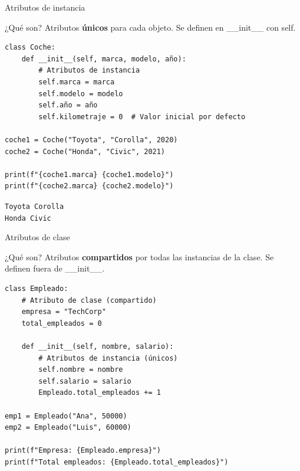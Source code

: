 \documentclass{beamer}
\begin{document}
\begin{frame}[fragile]{Atributos de instancia \faUser}
\begin{conceptbox}{¿Qué son?}
Atributos \textbf{únicos} para cada objeto. Se definen en \_\_init\_\_ con self.
\end{conceptbox}

\begin{lstlisting}
class Coche:
    def __init__(self, marca, modelo, año):
        # Atributos de instancia
        self.marca = marca
        self.modelo = modelo
        self.año = año
        self.kilometraje = 0  # Valor inicial por defecto

coche1 = Coche("Toyota", "Corolla", 2020)
coche2 = Coche("Honda", "Civic", 2021)

print(f"{coche1.marca} {coche1.modelo}")
print(f"{coche2.marca} {coche2.modelo}")
\end{lstlisting}

\vspace{-0.2cm}
\begin{tcolorbox}[colback=green!10,colframe=green,title={\small\faArrowCircleRight \ Salida},coltitle=fg0,left=3pt,right=3pt,top=2pt,bottom=2pt,boxsep=1pt]
\small\texttt{Toyota Corolla\\
Honda Civic}
\end{tcolorbox}
\end{frame}

\begin{frame}[fragile]{Atributos de clase \faLayerGroup}
\begin{conceptbox}{¿Qué son?}
Atributos \textbf{compartidos} por todas las instancias de la clase. Se definen fuera de \_\_init\_\_.
\end{conceptbox}

\begin{lstlisting}
class Empleado:
    # Atributo de clase (compartido)
    empresa = "TechCorp"
    total_empleados = 0
    
    def __init__(self, nombre, salario):
        # Atributos de instancia (únicos)
        self.nombre = nombre
        self.salario = salario
        Empleado.total_empleados += 1

emp1 = Empleado("Ana", 50000)
emp2 = Empleado("Luis", 60000)

print(f"Empresa: {Empleado.empresa}")
print(f"Total empleados: {Empleado.total_empleados}")
\end{lstlisting}
\end{frame}
\end{document}
